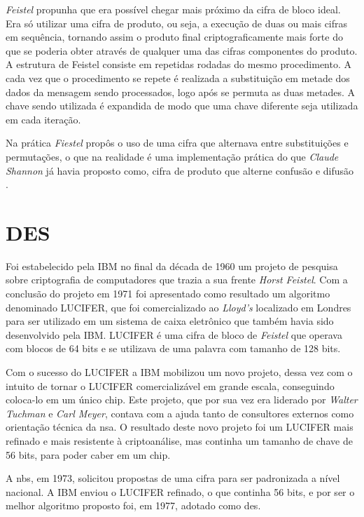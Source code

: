\textit{Feistel} propunha que era possível chegar mais próximo da cifra de bloco ideal. Era só utilizar uma cifra de produto, ou seja, a execução de duas ou mais cifras em sequência, tornando assim o produto final criptograficamente mais forte do que se poderia obter através de qualquer uma das cifras componentes do produto. A estrutura de Feistel consiste em repetidas rodadas do mesmo procedimento. A cada vez que o procedimento se repete é realizada a substituição em metade dos dados da mensagem sendo processados, logo após se permuta as duas metades. A chave sendo utilizada é expandida de modo que uma chave diferente seja utilizada em cada iteração.

Na prática \textit{Fiestel} propôs o uso de uma cifra que alternava entre substituições e permutações, o que na realidade é uma implementação prática do que \textit{Claude Shannon} já havia proposto como, cifra de produto que alterne confusão e difusão \cite{stallings14}.

\section{DES}
\label{sec:des}
Foi estabelecido pela IBM no final da década de 1960 um projeto de pesquisa sobre criptografia de computadores que trazia a sua frente \textit{Horst Feistel}. Com a conclusão do projeto em 1971 foi apresentado como resultado um algoritmo denominado LUCIFER, que foi comercializado ao \textit{Lloyd’s} localizado em Londres para ser utilizado em um sistema de caixa eletrônico que também havia sido desenvolvido pela IBM. LUCIFER é uma cifra de bloco de \textit{Feistel} que operava com blocos de 64 bits e se utilizava de uma palavra com tamanho de 128 bits.

Com o sucesso do LUCIFER a IBM mobilizou um novo projeto, dessa vez com o intuito de tornar o LUCIFER comercializável em grande escala, conseguindo coloca-lo em um único chip. Este projeto, que por sua vez era liderado por \textit{Walter Tuchman} e \textit{Carl Meyer}, contava com a ajuda tanto de consultores externos como orientação técnica da \acrfull{nsa}. O resultado deste novo projeto foi um LUCIFER mais refinado e mais resistente à criptoanálise, mas continha um tamanho de chave de 56 bits, para poder caber em um chip.

A \acrfull{nbs}, em 1973, solicitou propostas de uma cifra para ser padronizada a nível nacional. A IBM enviou o LUCIFER refinado, o que continha 56 bits, e por ser o melhor algoritmo proposto foi, em 1977, adotado como \acrfull{des}.

